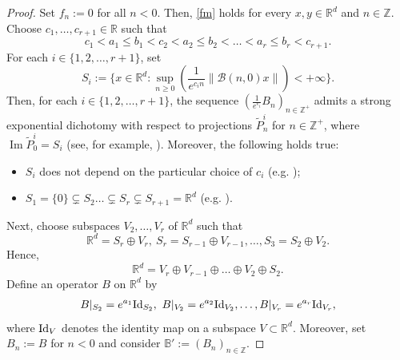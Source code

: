 \documentclass[reqno, a4paper, 10pt]{amsart}
\theoremstyle{plain}
\numberwithin{equation}{section}
\theoremstyle{remark}
\DeclareMathOperator{\Ima}{Im}
\def\R{\mathbb{R}}
\def\Id{\text{\rm Id}}
\def\Z{\mathbb{Z}}
\begin{document}
\begin{proof} 
Set $f_n:=0$ for all $n<0$. Then, \eqref{fm} holds for every $x, y\in \R^d$ and $n\in \Z$. Choose $c_1, \ldots, c_{r+1} \in \R$ such that
\[
c_1<a_1\le b_1<c_2 <a_2\le b_2 <\ldots < a_r \le b_r <c_{r+1}.
\]
For each $i\in \{1, 2, \ldots, r+1\}$, set
\[
S_i:=\bigg \{ x\in \R^d: \sup_{n\ge 0}\left ( \frac{1}{e^{c_in}} \| \mathcal B(n,0)x\|\right )<+\infty \bigg \}.
\]
Then, for each $i\in \{1,2, \ldots, r+1\}$, the sequence $(\frac{1}{e^{c_i}}B_n)_{n\in \Z^+}$ admits a strong exponential dichotomy with respect to projections $\tilde P_n^i$ for $n\in \Z^+$, where $\Ima \tilde P_0^i=S_i$ (see, for example, \cite[Proposition 3.3]{Bac25}). Moreover, the following holds true:
\begin{itemize}
\item $S_i$ does not depend on the particular choice of $c_i$ (e.g. \cite[Lemma 3.5]{Bac25});
\item $S_1=\{0\} \subsetneq S_2\ldots \subsetneq S_r \subsetneq S_{r+1}=\R^d$ (e.g. \cite[Lemma 3.6]{Bac25}).
\end{itemize}
Next, choose subspaces $V_2, \ldots, V_{r}$ of $\R^d$ such that
\[
\R^d=S_r\oplus V_r, \ S_r=S_{r-1} \oplus V_{r-1}, \ldots, S_3=S_2\oplus V_2.
\]
Hence,
\[
\R^d=V_r\oplus V_{r-1} \oplus \ldots \oplus V_2 \oplus S_2.
\]
Define an operator $B$ on $\R^d$ by
\begin{align}\label{BZ-}
B\rvert_{S_2}=e^{a_1}\Id_{S_2}, \ B\rvert_{V_2}=e^{a_2}\Id_{V_2}, \ldots, B\rvert_{V_r}=e^{a_r}\Id_{V_r},
\end{align}
where $\Id_V$ denotes the identity map on a subspace $V\subset \R^d$. Moreover, 
set $B_n:=B$ for $n<0$ and consider $\mathbb B':=(B_n)_{n\in \Z}$.


\end{proof}
\end{document}
